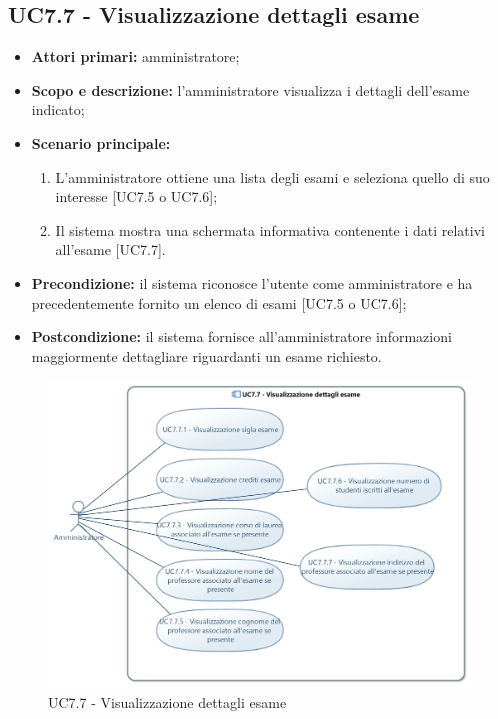 \documentclass[AnalisiDeiRequisiti.tex]{subfiles}
\begin{document}
\subsection{UC7.7 - Visualizzazione dettagli esame}
\begin{itemize}
	\item \textbf{Attori primari:} amministratore;
	\item \textbf{Scopo e descrizione:} l'amministratore visualizza i dettagli dell'esame indicato;
	\item \textbf{Scenario principale:}
	\begin{enumerate}
		\item L'amministratore ottiene una lista degli esami e seleziona quello di suo interesse [UC7.5 o UC7.6];
		\item Il sistema mostra una schermata informativa contenente i dati relativi all'esame [UC7.7].
	\end{enumerate}
	\item \textbf{Precondizione:} il sistema riconosce l'utente come amministratore e ha precedentemente fornito un elenco di esami [UC7.5 o UC7.6]; 
	\item \textbf{Postcondizione:} il sistema fornisce all'amministratore informazioni maggiormente dettagliare riguardanti un esame richiesto.
\end{itemize}
\begin{figure}[H]
	\centering
	\includegraphics[width=1\linewidth]{UC7_7.jpg}
	\caption{UC7.7 - Visualizzazione dettagli esame}
	\label{fig:UC7.7 - Visualizzazione dettagli esame}
\end{figure}
\end{document}

